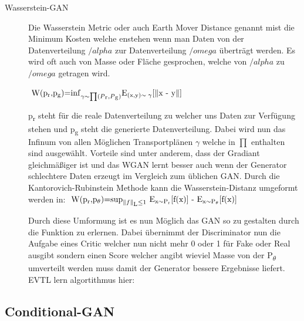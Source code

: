 \documentclass{llncs}
\begin{document}
\begin{description}
\item[Wasserstein-GAN]

Die Wasserstein Metric oder auch Earth Mover Distance genannt mist die Minimum Kosten welche enstehen wenn man Daten von der Datenverteilung $/alpha$ zur Datenverteilung $/omega$ überträgt werden. Es wird oft auch von Masse oder Fläche gesprochen, welche von $/alpha$ zu $/omega$ getragen wird. 

\begin{math} 
$
W(p\textsubscript{r},p\textsubscript{g})=$\inf_{\gamma\sim\prod(P\textsubscript{r},P\textsubscript{g})}$E\textsubscript{(x,y)$\sim\gamma$}[$\parallel$x - y$\parallel$]
$
\end{math}

p\textsubscript{r} steht für die reale Datenverteilung zu welcher uns Daten zur Verfügung stehen und p\textsubscript{g} steht die generierte Datenverteilung. Dabei wird nun das Infinum von allen Möglichen Transportplänen $\gamma$ welche in $\prod$ enthalten sind ausgewählt. Vorteile sind unter anderem, dass der Gradiant gleichmäßiger ist und das WGAN lernt besser auch wenn der Generator schlechtere Daten erzeugt im Vergleich zum üblichen GAN.
Durch die Kantorovich-Rubinstein Methode kann die Wasserstein-Distanz umgeformt werden in:
\begin{math} 
$
W(p\textsubscript{r},p\textsubscript{$\theta$})=$\sup_{\parallel f \parallel \textsubscript{L}\leq 1}$ E\textsubscript{x$\sim$P\textsubscript{r}}[f(x)] - E\textsubscript{x$\sim$P\textsubscript{$\theta$}}[f(x)]
$
\end{math}

Durch diese Umformung ist es nun Möglich das GAN so zu gestalten durch die Funktion zu erlernen. Dabei übernimmt der Discriminator nun die Aufgabe eines Critic welcher nun nicht mehr 0 oder 1 für Fake oder Real ausgibt sondern einen Score welcher angibt wieviel Masse von der P\textsubscript{$\theta$} umverteilt werden muss damit der Generator bessere Ergebnisse liefert. 
EVTL lern algortithmus hier:
\end{description}

\subsection{Conditional-GAN}
\end{document}
